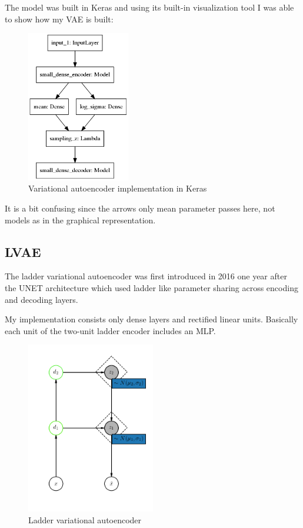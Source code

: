 \documentclass[11pt, english]{article}
\begin{document}
\par The model was built in Keras \cite{chollet2015keras} and using its built-in visualization tool I was able to show how my VAE is built:

\begin{figure}[H]
    \centering
    \includegraphics[width=0.4\textwidth]{vae_keras.png}
    \caption{Variational autoencoder implementation in Keras}
\end{figure}

\par It is a bit confusing since the arrows only mean parameter passes here, not models as in the graphical representation.

\subsection{LVAE}

\par The ladder variational autoencoder was first introduced in 2016 \cite{sonderby2016ladder} one year after the UNET \cite{ronneberger2015u} architecture which used ladder like parameter sharing across encoding and decoding layers.

\par My implementation consists only dense layers and rectified linear units. Basically each unit of the two-unit ladder encoder includes an MLP. 

\begin{figure}[H]
    \centering
    \includegraphics[width=0.5\textwidth]{lvae.png}
    \caption{Ladder variational autoencoder}
\end{figure}
\end{document}
